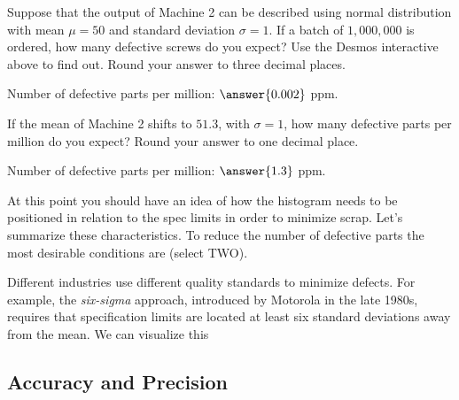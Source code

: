\documentclass{ximera}
\begin{document}
\begin{onlineOnly}
\begin{center} 
\end{center}
\end{onlineOnly}

\begin{question}\label{ex:defParts3}
    Suppose that the output of Machine 2 can be described using normal distribution with mean $\mu=50$ and standard deviation $\sigma=1$.  If a batch of $1,000,000$ is ordered, how many defective screws do you expect?  Use the Desmos interactive above to find out.  Round your answer to three decimal places.

    Number of defective parts per million: $\answer{0.002}$ ppm.

    If the mean of Machine 2 shifts to $51.3$, with $\sigma =1$, how many defective parts per million do you expect?  Round your answer to one decimal place.

    Number of defective parts per million: $\answer{1.3}$ ppm.
\end{question}

\begin{question}\label{prob:specs1}
At this point you should have an idea of how the histogram needs to be positioned in relation to the spec limits in order to minimize scrap.  Let's summarize these characteristics.  To reduce the number of defective parts the most desirable conditions are (select TWO).

    \begin{selectAll}
    \end{selectAll}
\end{question}

Different industries use different quality standards to minimize defects.  For example, the \emph{six-sigma} approach, introduced by Motorola in the late 1980s, requires that specification limits are located at least six standard deviations away from the mean.  We can visualize this 

\subsection*{Accuracy and Precision}
\end{document}
